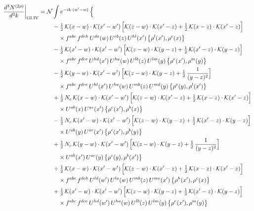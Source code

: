 \documentclass[10pt]{article}
\numberwithin{equation}{section}
\newcommand{\KK}{\mathcal K}
\newcommand{\NN}{\mathcal N}
\begin{document}
\begin{align}
\frac{d^3N^{(2\rho)}}{d^3k}\bigg|_{\rm GI.IV}={}&\NN\int e^{-ik\cdot(w'-w)}\,\Big\{\notag\\
&\quad -\tfrac12\,\KK(x-w)\cdot\KK(x'-w')\,\Big[\KK(z-w)\cdot\KK(x'-z)+\tfrac12\,\KK(x-z)\cdot\KK(x'-z)\Big]\notag\\
&\qquad\times f^{abc}\,f^{deh}\,U^{da}(w)\,U^{eb}(z)\,U^{hl}(x')\,\big\{\rho^{l}(x'),\rho^{c}(x)\big\}\notag\\
&\quad -\tfrac12\,\KK(x'-w)\cdot\KK(x'-w')\,\Big[\KK(z-w)\cdot\KK(y-z)+\tfrac12\,\KK(x'-z)\cdot\KK(y-z)\Big]\notag\\
&\qquad\times f^{abc}\,f^{dce}\,U^{hd}(x')\,U^{ha}(w)\,U^{lb}(z)\,U^{lm}(y)\,\big\{\rho^{e}(x'),\rho^{m}(y)\big\}\notag\\
&\quad -\tfrac12\,\KK(y-w)\cdot\KK(x'-w')\,\Big[\KK(z-w)\cdot\KK(y-z)+\tfrac12\,\frac{1}{(y-z)^2}\Big]\notag\\
&\qquad\times f^{abc}\,f^{dce}\,U^{hl}(x')\,U^{ha}(w)\,U^{mb}(z)\,U^{md}(y)\,\big\{\rho^{e}(y),\rho^{l}(x')\big\}\notag\\
&\quad +\tfrac12\,N_{c}\,\KK(x-w)\cdot\KK(x'-w')\,\Big[\KK(z-w)\cdot\KK(x'-z)+\tfrac12\,\KK(x-z)\cdot\KK(x'-z)\Big]\notag\\
&\qquad\times U^{ab}(x)\,U^{ac}(x')\,\big\{\rho^{c}(x'),\rho^{b}(x)\big\}\notag\\
&\quad -\tfrac12\,N_{c}\,\KK(x'-w)\cdot\KK(x'-w')\,\Big[\KK(z-w)\cdot\KK(y-z)+\tfrac12\,\KK(x'-z)\cdot\KK(y-z)\Big]\notag\\
&\qquad\times U^{ab}(y)\,U^{ac}(x')\,\big\{\rho^{c}(x'),\rho^{b}(y)\big\}\notag\\
&\quad +\tfrac12\,N_{c}\,\KK(y-w)\cdot\KK(x'-w')\,\Big[\KK(z-w)\cdot\KK(y-z)+\tfrac12\,\frac{1}{(y-z)^2}\Big]\notag\\
&\qquad\times U^{ab}(x')\,U^{ac}(y)\,\big\{\rho^{c}(y),\rho^{b}(x')\big\}\notag\\
&\quad +\tfrac12\,\KK(x-w)\cdot\KK(x'-w')\,\Big[\KK(z-w)\cdot\KK(x'-z)+\tfrac12\,\KK(x-z)\cdot\KK(x'-z)\Big]\notag\\
&\qquad\times f^{abc}\,f^{deh}\,U^{ld}(w')\,U^{la}(w)\,U^{mb}(z)\,U^{me}(x')\,\big\{\rho^{h}(x'),\rho^{c}(x)\big\}\notag\\
&\quad +\tfrac12\,\KK(x'-w)\cdot\KK(x'-w')\,\Big[\KK(z-w)\cdot\KK(y-z)+\tfrac12\,\KK(x'-z)\cdot\KK(y-z)\Big]\notag\\
&\qquad\times f^{abc}\,f^{dce}\,U^{hd}(w')\,U^{ha}(w)\,U^{lb}(z)\,U^{lm}(y)\,\big\{\rho^{e}(x'),\rho^{m}(y)\big\}\notag\\

\end{align}
\end{document}
